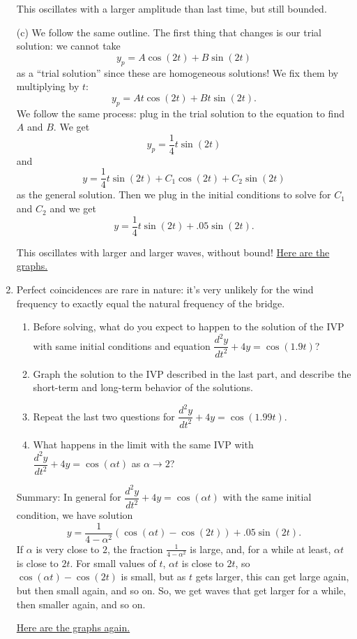 \documentclass[12pt]{amsart}
\numberwithin{equation}{section}
\theoremstyle{plain} %
\theoremstyle{definition}
\theoremstyle{remark}
\begin{document}
\begin{enumerate}
\begin{framed}
This oscillates with a larger amplitude than last time, but still bounded.

(c) We follow the same outline. The first thing that changes is our trial solution: we cannot take
\[ y_p = A \cos(2t) +  B \sin(2t)\]
as a ``trial solution'' since these are homogeneous solutions! We fix them by multiplying by $t$:
\[ y_p = A t\cos(2t) +  B t\sin(2t).\]
We follow the same process: plug in the trial solution to the equation to find $A$ and $B$. We get
\[ y_p = \frac{1}{4} t \sin(2t)\]
and
\[ y =  \frac{1}{4} t \sin(2t) + C_1 \cos(2t) + C_2 \sin(2t)\]
as the general solution. Then we plug in the initial conditions to solve for $C_1$ and $C_2$ and we get 
\[ y = \frac{1}{4} t \sin(2t) + .05 \sin(2t).\]

This oscillates with larger and larger waves, without bound!
\href{https://www.geogebra.org/m/bzsn4mmd}{Here are the graphs.}

\end{framed}

\item Perfect coincidences are rare in nature: it's very unlikely for the wind frequency to exactly equal the natural frequency of the bridge.
\begin{enumerate}
\item Before solving, what do you expect to happen to the solution of the IVP with same initial conditions and equation $\dfrac{d^2y}{dt^2} + 4y = \cos(1.9 t)$? 
\item Graph the solution to the IVP described in the last part, and describe the short-term and long-term behavior of the solutions.
\item Repeat the last two questions for $\dfrac{d^2y}{dt^2} + 4y = \cos(1.99 t)$.
\item What happens in the limit with the same IVP with $\dfrac{d^2y}{dt^2} + 4y = \cos(\alpha t)$ as $\alpha \to 2$?
\end{enumerate}

\begin{framed}
Summary: In general for $\dfrac{d^2y}{dt^2} + 4y = \cos(\alpha t)$ with the same initial condition, we have solution
\[ y = \frac{1}{4-\alpha^2} \left(\cos(\alpha t) - \cos(2t)\right) + .05 \sin(2t).\]
If $\alpha$ is very close to $2$, the fraction $\frac{1}{4-\alpha^2}$ is large, and, for a while at least, $\alpha t$ is close to $2t$. For small values of $t$, $\alpha t$ is close to $2t$, so $\cos(\alpha t) - \cos(2t)$ is small, but as $t$ gets larger, this can get large again, but then small again, and so on. So, we get waves that get larger for a while, then smaller again, and so on.

\href{https://www.geogebra.org/m/bzsn4mmd}{Here are the graphs again.}
\end{framed}
\end{enumerate}
\end{document}
